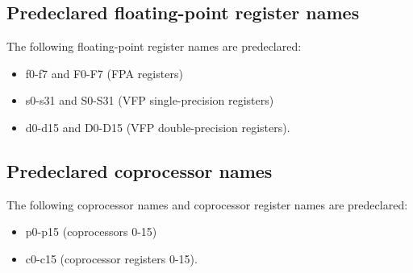 \subsection{Predeclared floating-point register names}
The following floating-point register names are predeclared:
\begin{itemize}
    \item f0-f7 and F0-F7 (FPA registers)
    \item s0-s31 and S0-S31 (VFP single-precision registers)
    \item d0-d15 and D0-D15 (VFP double-precision registers).
\end{itemize}

\subsection{Predeclared coprocessor names}
The following coprocessor names and coprocessor register names are predeclared:
\begin{itemize}
    \item p0-p15 (coprocessors 0-15)
    \item c0-c15 (coprocessor registers 0-15).
\end{itemize}

